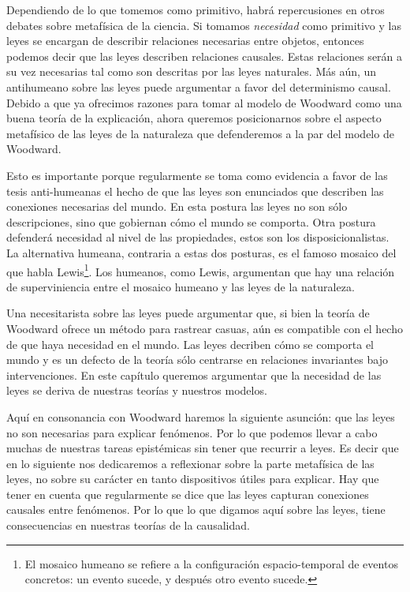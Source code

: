 Dependiendo de lo que tomemos como primitivo, habrá repercusiones en otros debates sobre metafísica de la ciencia. Si tomamos \emph{necesidad} como primitivo y las leyes se encargan de describir relaciones necesarias entre objetos, entonces podemos decir que las leyes describen relaciones causales. Estas relaciones serán a su vez necesarias tal como son descritas por las leyes naturales. Más aún, un antihumeano sobre las leyes puede argumentar a favor del determinismo causal. Debido a que ya ofrecimos razones para tomar al modelo de Woodward como una buena teoría de la explicación, ahora queremos posicionarnos sobre el aspecto metafísico de las leyes de la naturaleza que defenderemos a la par del modelo de Woodward.

Esto es importante porque regularmente se toma como evidencia a favor de las tesis anti-humeanas el hecho de que las leyes son enunciados que describen las conexiones necesarias del mundo. En esta postura las leyes no son sólo descripciones, sino que gobiernan cómo el mundo se comporta\cite{Bhogal2020}. Otra postura defenderá necesidad al nivel de las propiedades, estos son los disposicionalistas. La alternativa humeana, contraria a estas dos posturas, es el famoso mosaico del que habla Lewis\footnote{El mosaico humeano se refiere a la configuración espacio-temporal de eventos concretos: un evento sucede, y después otro evento sucede.}. Los humeanos, como Lewis, argumentan que hay una relación de superviniencia entre el mosaico humeano y las leyes de la naturaleza.

Una necesitarista sobre las leyes puede argumentar que, si bien la teoría de Woodward ofrece un método para rastrear casuas, aún es compatible con el hecho de que haya necesidad en el mundo. Las leyes decriben cómo se comporta el mundo y es un defecto de la teoría sólo centrarse en relaciones invariantes bajo intervenciones. En este capítulo queremos argumentar que la necesidad de las leyes se deriva de nuestras teorías y nuestros modelos.

Aquí en consonancia con Woodward haremos la siguiente asunción: que las leyes no son necesarias para explicar fenómenos. Por lo que podemos llevar a cabo muchas de nuestras tareas epistémicas sin tener que recurrir a leyes. Es decir que en lo siguiente nos dedicaremos a reflexionar sobre la parte metafísica de las leyes, no sobre su carácter en tanto dispositivos útiles para explicar. Hay que tener en cuenta que regularmente se dice que las leyes capturan conexiones causales entre fenómenos. Por lo que lo que digamos aquí sobre las leyes, tiene consecuencias en nuestras teorías de la causalidad.

